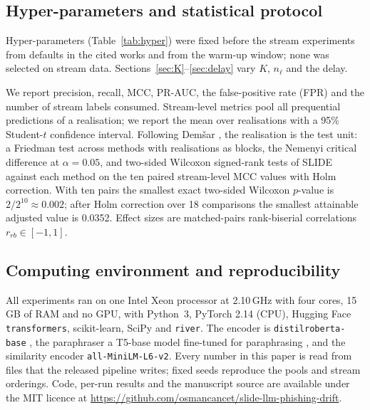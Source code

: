 \subsection{Hyper-parameters and statistical protocol}
Hyper-parameters (Table~\ref{tab:hyper}) were fixed before the stream experiments from defaults in the cited works and from the warm-up window; none was selected on stream data. Sections~\ref{sec:K}--\ref{sec:delay} vary $K$, $n_\ell$ and the delay.



We report precision, recall, MCC, PR-AUC, the false-positive rate (FPR) and the number of stream labels consumed. Stream-level metrics pool all prequential predictions of a realisation; we report the mean over realisations with a 95\% Student-$t$ confidence interval. Following Dem\v{s}ar \cite{demsar2006}, the realisation is the test unit: a Friedman test across methods with realisations as blocks, the Nemenyi critical difference at $\alpha=0.05$, and two-sided Wilcoxon signed-rank tests of SLIDE against each method on the ten paired stream-level MCC values with Holm correction. With ten pairs the smallest exact two-sided Wilcoxon $p$-value is $2/2^{10}\approx0.002$; after Holm correction over 18 comparisons the smallest attainable adjusted value is 0.0352. Effect sizes are matched-pairs rank-biserial correlations $r_{rb}\in[-1,1]$.

\subsection{Computing environment and reproducibility}\label{sec:repro}
All experiments ran on one Intel Xeon processor at 2.10\,GHz with four cores, 15\,GB of RAM and no GPU, with Python~3, PyTorch 2.14 (CPU), Hugging Face \texttt{transformers}, scikit-learn, SciPy and \texttt{river}. The encoder is \texttt{distilroberta-base} \cite{sanh2019,liu2019roberta}, the paraphraser a T5-base model fine-tuned for paraphrasing \cite{hf_paraphraser}, and the similarity encoder \texttt{all-MiniLM-L6-v2}. Every number in this paper is read from files that the released pipeline writes; fixed seeds reproduce the pools and stream orderings. Code, per-run results and the manuscript source are available under the MIT licence at \url{https://github.com/osmancancet/slide-llm-phishing-drift}.
